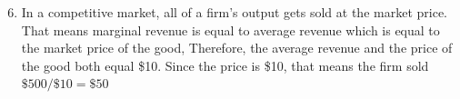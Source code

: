 \documentclass{article}
\begin{document}
\begin{enumerate}
%
%
%
%
%	
%	
%		
%	
%	

\setcounter{enumi}{5}	
\item In a competitive market, all of a firm's output gets sold at the market price. That means marginal revenue is equal to average revenue which is equal to the market price of the good, Therefore, the average revenue and the price of the good both equal \$10. Since the price is \$10, that means the firm sold $\$500 / \$10 = \$50$


\end{enumerate}
\end{document}
